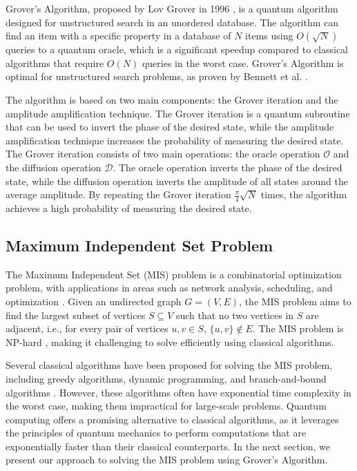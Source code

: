 Grover's Algorithm, proposed by Lov Grover in 1996 \cite{grover}, is a quantum algorithm designed for unstructured search in an unordered database. The algorithm can find an item with a specific property in a database of $N$ items using $O(\sqrt{N})$ queries to a quantum oracle, which is a significant speedup compared to classical algorithms that require $O(N)$ queries in the worst case. Grover's Algorithm is optimal for unstructured search problems, as proven by Bennett et al. \cite{grover_optimal}.

The algorithm is based on two main components: the Grover iteration and the amplitude amplification technique. The Grover iteration is a quantum subroutine that can be used to invert the phase of the desired state, while the amplitude amplification technique increases the probability of measuring the desired state. The Grover iteration consists of two main operations: the oracle operation $\mathcal{O}$ and the diffusion operation $\mathcal{D}$. The oracle operation inverts the phase of the desired state, while the diffusion operation inverts the amplitude of all states around the average amplitude. By repeating the Grover iteration $\frac{\pi}{4}\sqrt{N}$ times, the algorithm achieves a high probability of measuring the desired state.

\subsection{Maximum Independent Set Problem}
\label{subsec:mis}

The Maximum Independent Set (MIS) problem is a combinatorial optimization problem, with applications in areas such as network analysis, scheduling, and optimization \cite{mis_applications}. Given an undirected graph $G=(V, E)$, the MIS problem aims to find the largest subset of vertices $S \subseteq V$ such that no two vertices in $S$ are adjacent, i.e., for every pair of vertices $u, v \in S$, $\{u, v\} \notin E$. The MIS problem is NP-hard \cite{np_hard}, making it challenging to solve efficiently using classical algorithms.

Several classical algorithms have been proposed for solving the MIS problem, including greedy algorithms, dynamic programming, and branch-and-bound algorithms \cite{classical_mis}. However, these algorithms often have exponential time complexity in the worst case, making them impractical for large-scale problems. Quantum computing offers a promising alternative to classical algorithms, as it leverages the principles of quantum mechanics to perform computations that are exponentially faster than their classical counterparts. In the next section, we present our approach to solving the MIS problem using Grover's Algorithm.

